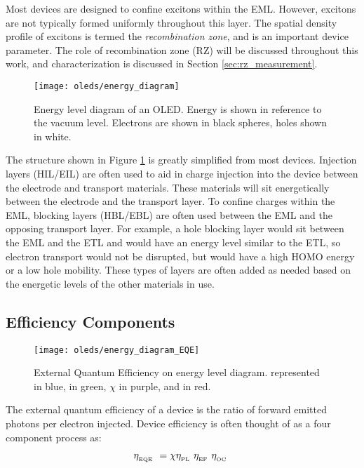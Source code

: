\documentclass[../thesis.tex]{subfiles}
\begin{document}
Most devices are designed to confine excitons within the EML.
However, excitons are not typically formed uniformly throughout this layer.
The spatial density profile of excitons is termed the \textit{recombination zone}, and is an important device parameter.
The role of recombination zone (RZ) will be discussed throughout this work, and characterization is discussed in Section \ref{sec:rz_measurement}.

\begin{figure}[ht]
\centering
\texttt{[image: oleds/energy\_diagram]}
\caption{Energy level diagram of an OLED.  Energy is shown in reference to the vacuum level.  Electrons are shown in black spheres, holes shown in white.}
\label{fig:oleds_energy_level_diagram}
\end{figure}

The structure shown in Figure \ref{fig:oleds_energy_level_diagram} is greatly simplified from most devices.
Injection layers (HIL/EIL) are often used to aid in charge injection into the device between the electrode and transport materials.
These materials will sit energetically between the electrode and the transport layer.
To confine charges within the EML, blocking layers (HBL/EBL) are often used between the EML and the opposing transport layer.
For example, a hole blocking layer would sit between the EML and the ETL and would have an energy level similar to the ETL, so electron transport would not be disrupted, but would have a high HOMO energy or a low hole mobility.
These types of layers are often added as needed based on the energetic levels of the other materials in use.

\subsection{Efficiency Components}

\begin{figure}[ht]
\centering
\texttt{[image: oleds/energy\_diagram\_EQE]}
\caption{External Quantum Efficiency on energy level diagram.  \oc represented in blue, \pl in green, $\chi$ in purple, and \ef in red.}
\label{fig:oleds_energy_level_diagram_EQE}
\end{figure}

The external quantum efficiency \eqe of a device is the ratio of forward emitted photons per electron injected.  
Device efficiency is often thought of as a four component process as:\supercite{Baldo1998a}

\begin{equation}
\eta_{_\text{\tiny EQE}}\ =\chi\eta_{_\text{\tiny PL}}\ \eta_{_\text{\tiny EF}}\ \eta_{_\text{\tiny OC}}\ 
\label{eqn:eqe}
\end{equation}
\end{document}
